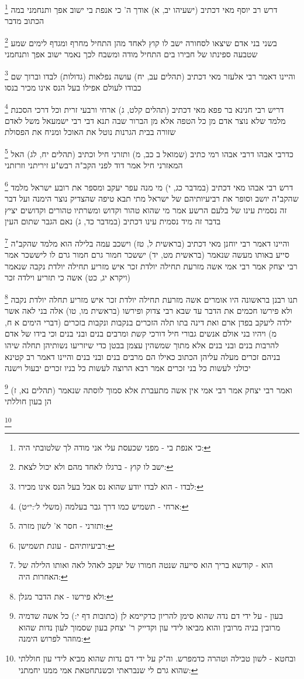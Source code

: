 \documentclass[12pt, openany]{book}
\newcommand{\footnotecomment}[1]{
	\renewcommand\thefootnote{}
	\footnote{#1}}
\newcommand{\commenta}[1]{\footnotecomment{#1}}
\begin{document}
{{\commenta{כי אנפת בי - מפני שכעסת עלי אני מודה לך שלטובתי היה:}
דרש רב יוסף מאי דכתיב (ישעיהו יב, א) אודך ה' כי אנפת בי ישוב אפך ותנחמני במה הכתוב מדבר 
\commenta{ישב לו קוץ - ברגלו לאחד מהם ולא יכול לצאת:}
בשני בני אדם שיצאו לסחורה ישב לו קוץ לאחד מהן התחיל מחרף ומגדף לימים שמע שטבעה ספינתו של חבירו בים התחיל מודה ומשבח לכך נאמר ישוב אפך ותנחמני 
\commenta{לבדו - הוא לבדו יודע שהוא נס אבל בעל הנס אינו מכירו:}
והיינו דאמר רבי אלעזר מאי דכתיב (תהלים עב, יח) עושה נפלאות (גדולות) לבדו וברוך שם כבודו לעולם אפילו בעל הנס אינו מכיר בנסו 
\commenta{ארחי - תשמיש כמו דרך גבר בעלמה (משלי ל׳:י״ט):}
דריש רבי חנינא בר פפא מאי דכתיב (תהלים קלט, ג) ארחי ורבעי זרית וכל דרכי הסכנת מלמד שלא נוצר אדם מן כל הטפה אלא מן הברור שבה תנא דבי רבי ישמעאל משל לאדם שזורה בבית הגרנות נוטל את האוכל ומניח את הפסולת 
\commenta{ותזרני - חסר א' לשון מזרה:}
כדרבי אבהו דרבי אבהו רמי כתיב (שמואל ב כב, מ) ותזרני חיל וכתיב (תהלים יח, לג) האל המאזרני חיל אמר דוד לפני הקב"ה רבש"ע זיריתני וזרזתני 
\commenta{רביעיותיהם - עונת תשמישן:}
דרש רבי אבהו מאי דכתיב (במדבר כג, י) מי מנה עפר יעקב ומספר את רובע ישראל מלמד שהקב"ה יושב וסופר את רביעיותיהם של ישראל מתי תבא טיפה שהצדיק נוצר הימנה 
ועל דבר זה נסמית עינו של בלעם הרשע אמר מי שהוא טהור וקדוש ומשרתיו טהורים וקדושים יציץ בדבר זה מיד נסמית עינו דכתיב (במדבר כד, ג) נאם הגבר שתום העין 
\commenta{הוא - קודשא בריך הוא סייעה שנטה חמורו של יעקב לאהל לאה ואותו הלילה של האחרות היה:}
והיינו דאמר רבי יוחנן מאי דכתיב (בראשית ל, טז) וישכב עמה בלילה הוא מלמד שהקב"ה סייע באותו מעשה שנאמר (בראשית מט, יד) יששכר חמור גרם חמור גרם לו ליששכר 
אמר רבי יצחק אמר רבי אמי אשה מזרעת תחילה יולדת זכר איש מזריע תחילה יולדת נקבה שנאמר (ויקרא יג, כט) אשה כי תזריע וילדה זכר 
\commenta{ולא פירשו - את הדבר מנלן:}
תנו רבנן בראשונה היו אומרים אשה מזרעת תחילה יולדת זכר איש מזריע תחלה יולדת נקבה ולא פירשו חכמים את הדבר עד שבא רבי צדוק ופירשו (בראשית מו, טו) אלה בני לאה אשר ילדה ליעקב בפדן ארם ואת דינה בתו תלה הזכרים בנקבות ונקבות בזכרים 
(דברי הימים א ח, מ) ויהיו בני אולם אנשים גבורי חיל דורכי קשת ומרבים בנים ובני בנים וכי בידו של אדם להרבות בנים ובני בנים אלא מתוך
שמשהין עצמן בבטן כדי שיזריעו נשותיהן תחלה שיהו בניהם זכרים מעלה עליהן הכתוב כאילו הם מרבים בנים ובני בנים והיינו דאמר רב קטינא יכולני לעשות כל בני זכרים אמר רבא הרוצה לעשות כל בניו זכרים יבעול וישנה 
\commenta{בעון - על ידי דם נדה שהוא סימן להריון כדקיימא לן (כתובות דף י:) כל אשה שדמיה מרובין בניה מרובין והוא מביאו לידי עון וקדייק ר' יצחק בעון שסמוך לעון נדות שהוא מוזהר לפרוש הימנה:}
ואמר רבי יצחק אמר רבי אמי אין אשה מתעברת אלא סמוך לוסתה שנאמר (תהלים נא, ז) הן בעון חוללתי 
\commenta{ובחטא - לשון טבילה וטהרה כדמפרש. וה"ק על ידי דם נדות שהוא מביא לידי עון חוללתי שהוא גרם לי שנבראתי וכשנתחטאת אמי ממנו יחמתני:}
}}
\end{document}
